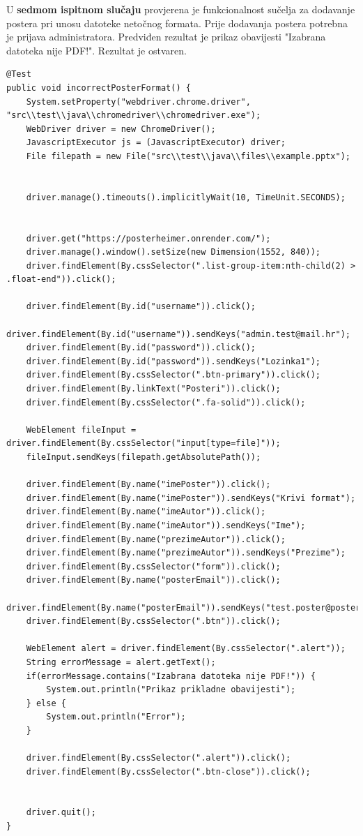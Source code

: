 		U \textbf{sedmom ispitnom slučaju} provjerena je funkcionalnost sučelja za dodavanje postera pri unosu datoteke netočnog formata. Prije dodavanja postera potrebna je prijava administratora. Predviđen rezultat je prikaz obavijesti "Izabrana datoteka nije PDF!". Rezultat je ostvaren.  
		
	\begin{lstlisting}
@Test
public void incorrectPosterFormat() {
	System.setProperty("webdriver.chrome.driver", "src\\test\\java\\chromedriver\\chromedriver.exe");
	WebDriver driver = new ChromeDriver();
	JavascriptExecutor js = (JavascriptExecutor) driver;
	File filepath = new File("src\\test\\java\\files\\example.pptx");
	
	
	driver.manage().timeouts().implicitlyWait(10, TimeUnit.SECONDS);
	
	
	driver.get("https://posterheimer.onrender.com/");
	driver.manage().window().setSize(new Dimension(1552, 840));
	driver.findElement(By.cssSelector(".list-group-item:nth-child(2) > .float-end")).click();	  
	
	driver.findElement(By.id("username")).click();
	driver.findElement(By.id("username")).sendKeys("admin.test@mail.hr");
	driver.findElement(By.id("password")).click();
	driver.findElement(By.id("password")).sendKeys("Lozinka1");
	driver.findElement(By.cssSelector(".btn-primary")).click();
	driver.findElement(By.linkText("Posteri")).click();
	driver.findElement(By.cssSelector(".fa-solid")).click();
	
	WebElement fileInput = driver.findElement(By.cssSelector("input[type=file]"));
	fileInput.sendKeys(filepath.getAbsolutePath());
	
	driver.findElement(By.name("imePoster")).click();
	driver.findElement(By.name("imePoster")).sendKeys("Krivi format");
	driver.findElement(By.name("imeAutor")).click();
	driver.findElement(By.name("imeAutor")).sendKeys("Ime");
	driver.findElement(By.name("prezimeAutor")).click();
	driver.findElement(By.name("prezimeAutor")).sendKeys("Prezime");
	driver.findElement(By.cssSelector("form")).click();
	driver.findElement(By.name("posterEmail")).click();
	driver.findElement(By.name("posterEmail")).sendKeys("test.poster@posterheimer.hr");
	driver.findElement(By.cssSelector(".btn")).click();
	
	WebElement alert = driver.findElement(By.cssSelector(".alert"));
	String errorMessage = alert.getText();
	if(errorMessage.contains("Izabrana datoteka nije PDF!")) {
		System.out.println("Prikaz prikladne obavijesti");
	} else {
		System.out.println("Error");
	}		
	
	driver.findElement(By.cssSelector(".alert")).click();
	driver.findElement(By.cssSelector(".btn-close")).click();
	
	
	driver.quit();
}
	\end{lstlisting}
	
